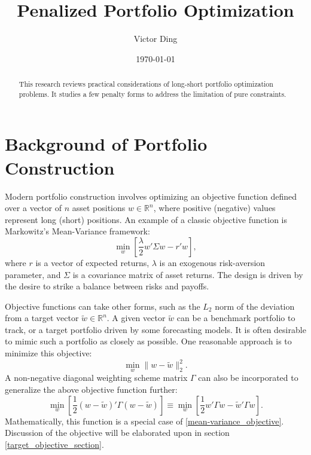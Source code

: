 \documentclass[11pt, letterpaper]{article}
\title{Penalized Portfolio Optimization}
\author{Victor Ding}
\affil{New Canaan High School}
\date{\today}
\begin{document}
\maketitle

\newpage
\setcounter{page}{1} %
\pagestyle{plain}

\begin{abstract}
\noindent
This research reviews practical considerations of long-short portfolio optimization problems. It studies a few penalty forms to
address the limitation of pure constraints.
\end{abstract}
\newpage
\section{Background of Portfolio Construction}

Modern portfolio construction involves optimizing an objective function defined over a vector of $n$ asset positions
$w \in \mathds{R}^n$, where positive (negative) values represent long (short) positions. An example of a classic objective
function is Markowitz's Mean-Variance framework:
\begin{equation}
    \label{mean-variance_objective}
    \underset{w}{\min} \left[\frac{\lambda}{2} w' \Sigma w - r' w\right],
\end{equation}
where $r$ is a vector of expected returns, $\lambda$ is an exogenous risk-aversion parameter, and $\Sigma$ is a covariance
matrix of asset returns. The design is driven by the desire to strike a balance between risks and payoffs.

Objective functions can take other forms, such as the $L_2$ norm of the deviation from a target vector $\tilde{w} \in
\mathds{R}^n$. A given vector $\tilde{w}$ can be a benchmark portfolio to track, or a target portfolio driven by some
forecasting models. It is often desirable to mimic such a portfolio as closely as possible. One reasonable approach is to
minimize this objective:
\begin{equation*}
	\underset{w}{\min} \lVert w - \tilde{w}\rVert_2^2.
\end{equation*}
A non-negative diagonal weighting scheme matrix $\Gamma$ can also be incorporated to generalize the above objective function further:
\begin{equation}
  \label{gamma_matrix}
	\underset{w}{\min}\left[\frac{1}{2} (w - \tilde{w})'\Gamma(w - \tilde{w})\right] \equiv
  \underset{w}{\min}\left[\frac{1}{2} w'\Gamma w - \tilde{w}'\Gamma w \right].
\end{equation}
Mathematically, this function is a special case of \eqref{mean-variance_objective}. Discussion of the objective will be elaborated upon in section
\ref{target_objective_section}.
\end{document}
